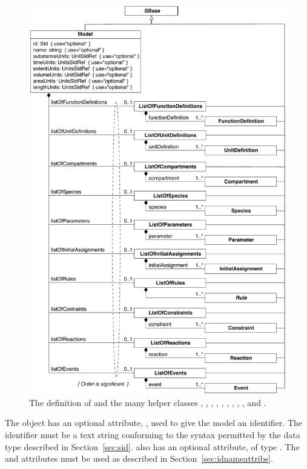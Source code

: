 \begin{figure}[htb]
  \centering
  \vspace*{-2ex}
  \includegraphics[scale=0.76]{figs/model-uml}
  \vspace*{-1.1ex}
  \caption{The definition of \Model and the many helper
      classes \ListOfFunctionDefinitions, \ListOfUnitDefinitions,
      \ListOfCompartments, \ListOfSpecies, \ListOfParameters,
      \ListOfInitialAssignments, \ListOfRules, \ListOfConstraints,
      \ListOfReactions, and \ListOfEvents.}
  \label{fig:model}
\end{figure}

The \Model object has an optional attribute, , used to
give the model an identifier.  The identifier must be a text
string conforming to the syntax permitted by the 
data type described in Section~\ref{sec:sid}.  \Model also has an
optional  attribute, of type .  The
 and  attributes must be used as described in
Section~\ref{sec:idnameattribs}.

